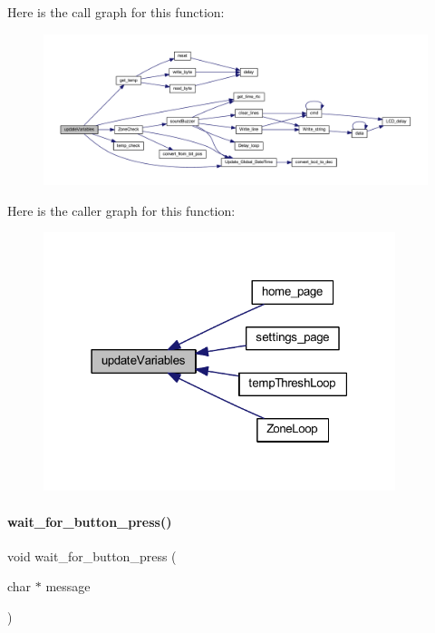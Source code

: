 Here is the call graph for this function\+:
\nopagebreak
\begin{figure}[H]
\begin{center}
\leavevmode
\includegraphics[width=350pt]{a00038_a58a141413d55108017a06b4a4290b956_cgraph}
\end{center}
\end{figure}
Here is the caller graph for this function\+:
\nopagebreak
\begin{figure}[H]
\begin{center}
\leavevmode
\includegraphics[width=291pt]{a00038_a58a141413d55108017a06b4a4290b956_icgraph}
\end{center}
\end{figure}
\mbox{\label{a00038_a59a5b2f0e89c6de897d4bd5d10bc8142}} 
\paragraph{wait\+\_\+for\+\_\+button\+\_\+press()}
{\footnotesize\ttfamily void wait\+\_\+for\+\_\+button\+\_\+press (\begin{DoxyParamCaption}\item[{char $\ast$}]{message }\end{DoxyParamCaption})}

